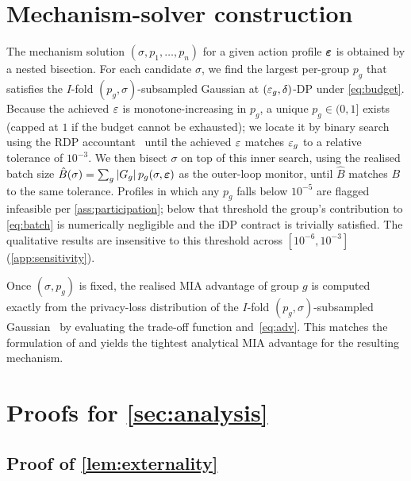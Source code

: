 \appendices

\section{Mechanism-solver construction}
\label{app:mechanism}

The mechanism solution $(\sigma, p_1,\dots,p_n)$ for a given action
profile $\boldsymbol{\varepsilon}$ is obtained by a nested bisection. For
each candidate $\sigma$, we find the largest per-group $p_g$ that
satisfies the $I$-fold $(p_g, \sigma)$-subsampled Gaussian at
$(\varepsilon_g, \delta)$-DP under \eqref{eq:budget}. Because the achieved $\varepsilon$ is
monotone-increasing in $p_g$, a unique $p_g \in (0, 1]$ exists
(capped at $1$ if the budget cannot be exhausted); we locate it by
binary search using the \ac{RDP} accountant~\cite{mironov2017renyi}
until the achieved $\varepsilon$ matches $\varepsilon_g$ to a relative tolerance of
$10^{-3}$. We then bisect $\sigma$ on top of this inner search, using
the realised batch size $\hat B(\sigma) = \sum_g |G_g|\, p_g(\sigma,
\boldsymbol{\varepsilon})$ as the outer-loop monitor, until $\hat B$ matches
$B$ to the same tolerance. Profiles in which any $p_g$ falls below
$10^{-5}$ are flagged infeasible per \cref{ass:participation}; below
that threshold the group's contribution to \eqref{eq:batch} is numerically
negligible and the \ac{iDP} contract is trivially satisfied. The
qualitative results are insensitive to this threshold across
$[10^{-6}, 10^{-3}]$ (\cref{app:sensitivity}).

Once $(\sigma, p_g)$ is fixed, the realised \ac{MIA} advantage of group
$g$ is computed exactly from the privacy-loss distribution of the
$I$-fold $(p_g, \sigma)$-subsampled
Gaussian~\cite{google-dp-accounting} by evaluating the trade-off
function and~\eqref{eq:adv}. This matches the formulation of
\citet{kaiser2026your} and yields the tightest analytical \ac{MIA}
advantage for the resulting mechanism.

\section{Proofs for \texorpdfstring{\cref{sec:analysis}}{Section IV}}
\label{app:proofs}

\subsection{Proof of \texorpdfstring{\cref{lem:externality}}{the externality lemma}}
\label{app:proof-externality}

